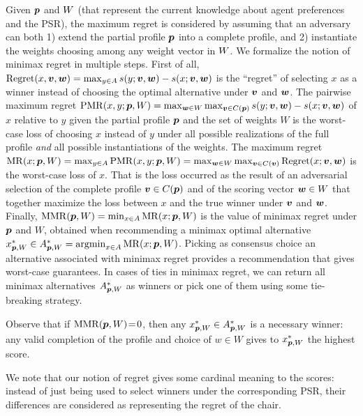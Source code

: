 \documentclass{article}
\begin{document}
Given ${\bm{p}}$ and $W$ (that represent the current knowledge about agent preferences and the PSR),
the maximum regret is considered by assuming that an adversary can both 1) extend the partial profile ${\bm{p}}$ into a complete profile, and 2) instantiate the weights choosing among any weight vector in $W$. %
We formalize the notion of minimax regret in multiple steps.
First of all, $\operatorname{Regret}(x, \bm{v}, \bm{w}) = \max_{y \in A} s(y; \bm{v},\bm{w}) - s(x; \bm{v}, \bm{w})$ is the “regret” of selecting $x$ as a winner instead of choosing the optimal alternative under $\bm{v}$ and $\bm{w}$.
The pairwise maximum regret $\operatorname{PMR}(x,y;{\bm{p}},W) = \max_{\bm{w} \in W} \max_{\bm{v} \in C({\bm{p}})} s(y; \bm{v},\bm{w}) - s(x; \bm{v},\bm{w})$ of $x$ relative to $y$ given the partial profile ${\bm{p}}$ and the set of weights $W$
is the worst-case loss of choosing $x$ instead of $y$ under all possible realizations of the full profile {\em and} all possible instantiations of the weights.
The maximum regret $\operatorname{MR}(x;{\bm{p}},W) = \max_{y \in A} \operatorname{PMR}(x,y; {\bm{p}}, W) = \max_{\bm{w} \in W} \max_{\bm{v} \in C(\bm{v})} \operatorname{Regret}(x; \bm{v}, \bm{w})$ is the worst-case loss of $x$. That is the loss occurred as the result of an adversarial selection of the complete profile $\bm{v} \in C({\bm{p}})$ and of the scoring vector $\bm{w} \in W$ that together maximize the loss between $x$ and the true winner under $\bm{v}$ and $\bm{w}$.
Finally,  $\operatorname{MMR}({\bm{p}},W) = \min_{x \in A} \operatorname{MR}(x;{\bm{p}},W)$ is the value of minimax regret under ${\bm{p}}$ and $W$, obtained when recommending a minimax optimal alternative $x^*_{{\bm{p}}, W} \in A^*_{{\bm{p}}, W} = \operatorname*{argmin}_{x \in A} \operatorname{MR}(x;{\bm{p}},W)$.
Picking as consensus choice an alternative associated with minimax regret provides a recommendation that gives worst-case guarantees. 
In cases of ties in minimax regret, we can return all minimax alternatives $A^*_{{\bm{p}}, W}$ as winners or pick one of them using some tie-breaking strategy.

Observe that if $\operatorname{MMR}({\bm{p}}, W)\!=\!0$, then any $x^{*}_{{\bm{p}},W} \in A^*_{{\bm{p}}, W}$ is a necessary winner: any valid completion of the profile and choice of $w \in W$ gives to $x^{*}_{{\bm{p}},W}$ the highest score.

We note that our notion of regret gives some cardinal meaning to the scores: instead of just being used to select winners under the corresponding PSR, their differences are considered as representing the regret of the chair.
\end{document}
